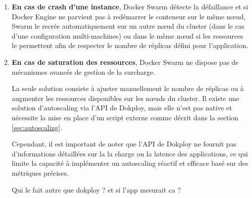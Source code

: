 \documentclass{rapportClass} %
\begin{document}
\begin{enumerate}
\item \textbf{En cas de crash d'une instance}, Docker Swarm détecte la
  défaillance et si Docker Engine ne parvient pas à redémarrer le
  conteneur sur le même nœud, Swarm le recrée automatiquement sur un
  autre nœud du cluster (dans le cas d'une configuration multi-machines)
  ou dans le même nœud si les ressources le permettent afin de respecter
  le nombre de réplicas défini pour l'application.


  \smallskip
\item 
  \textbf{En cas de saturation des ressources}, Docker Swarm ne dispose
  pas de mécanismes avancés de gestion de la surcharge.

  \smallskip
  La seule solution consiste à ajuster manuellement le nombre de
  réplicas ou à augmenter les ressources disponibles sur les nœuds du
  cluster. Il existe une solution d'autoscaling via l'API de Dokploy,
  mais elle n'est pas native et nécessite la mise en place d'un script
  externe comme décrit dans la section \ref{sec:autoscaling}.

  \smallskip
  Cependant, il est important de noter que l'API de Dokploy ne fournit
  pas d'informations détaillées sur la la charge ou la latence des
  applications, ce qui limite la capacité à implémenter un autoscaling
  réactif et efficace basé sur des métriques précises.

  {\color{red} Qui le fait autre que dokploy ? et si l'app mesurait ca ?}
\end{enumerate}


\end{document}
